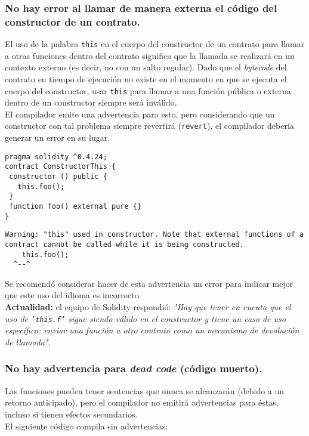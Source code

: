 \subsubsection{No hay error al llamar de manera externa el código del constructor de un contrato.}

El uso de la palabra \texttt{this} en el cuerpo del constructor de un contrato para llamar a otras funciones dentro del contrato significa que la llamada se realizará en un contexto externo (es decir, no con un salto regular). Dado que el \textit{bytecode} del contrato en tiempo de ejecución no existe en el momento en que se ejecuta el cuerpo del constructor, usar \texttt{this} para llamar a una función pública o externa dentro de un constructor siempre será inválido.\\

El compilador emite una advertencia para esto, pero considerando que un constructor con tal problema siempre revertirá (\texttt{revert}), el compilador debería generar un error en su lugar.\\

\begin{lstlisting}[language=Solidity]
pragma solidity ^0.4.24;
contract ConstructorThis {
 constructor () public {
   this.foo();
 }
 function foo() external pure {}
}
\end{lstlisting}

\begin{lstlisting}
Warning: "this" used in constructor. Note that external functions of a contract cannot be called while it is being constructed.
	this.foo();
  ^--^
\end{lstlisting}  

Se recomendó considerar hacer de esta advertencia un error para indicar mejor que este uso del idioma es incorrecto.\\

\textbf{Actualidad:} el equipo de Solidity respondió: \textit{"Hay que tener en cuenta que el uso de \texttt{'this.f'} sigue siendo válido en el constructor y tiene un caso de uso específico: enviar una función a otro contrato como un mecanismo de devolución de llamada"}.\\

\subsubsection{No hay advertencia para \textit{dead code} (código muerto).}

Las funciones pueden tener sentencias que nunca se alcanzarán (debido a un retorno anticipado), pero el compilador no emitirá advertencias para éstas, incluso si tienen efectos secundarios.\\
 El siguiente código compila sin advertencias:

